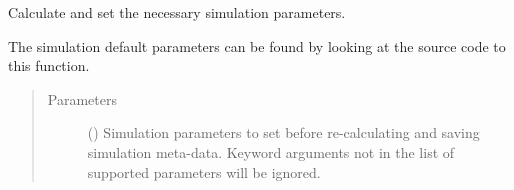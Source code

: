 \documentclass[letterpaper,10pt,english]{sphinxmanual}
\begin{document}
\begin{fulllineitems}
\begin{fulllineitems}
\label{\detokenize{modules/simulation:simulation.Simulation.set_log_level}}
\end{fulllineitems}


\begin{fulllineitems}
\label{\detokenize{modules/simulation:simulation.Simulation.set_logfile_level}}
\end{fulllineitems}


\begin{fulllineitems}
\label{\detokenize{modules/simulation:simulation.Simulation.set_scheduler_args}}
\end{fulllineitems}


\begin{fulllineitems}
\label{\detokenize{modules/simulation:simulation.Simulation.set_terminal_level}}
\end{fulllineitems}


\begin{fulllineitems}
\label{\detokenize{modules/simulation:simulation.Simulation.set_version}}
\end{fulllineitems}


\begin{fulllineitems}
\label{\detokenize{modules/simulation:simulation.Simulation.simulation_parameters}}
Calculate and set the necessary simulation parameters.

The simulation default parameters can be found by looking at the source code to this function.
\begin{quote}\begin{description}
\item[{Parameters}] \leavevmode
{} () \textendash{} Simulation parameters to set before re-calculating and saving simulation meta-data. Keyword arguments not in the list of supported parameters will be ignored.


\end{description}
\end{quote}
\end{fulllineitems}
\end{fulllineitems}
\end{document}
